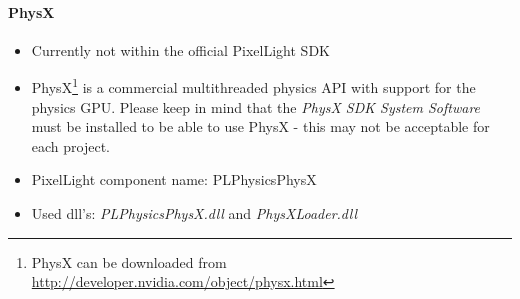\paragraph{PhysX}
\begin{itemize}
\item Currently not within the official PixelLight SDK
\item PhysX\footnote{PhysX can be downloaded from \url{http://developer.nvidia.com/object/physx.html}} is a commercial multithreaded physics API with support for the physics GPU. Please keep in mind that the \emph{PhysX SDK System Software} must be installed to be able to use PhysX - this may not be acceptable for each project.
\item PixelLight component name: PLPhysicsPhysX
\item Used dll's: \emph{PLPhysicsPhysX.dll} and \emph{PhysXLoader.dll}
\end{itemize}
